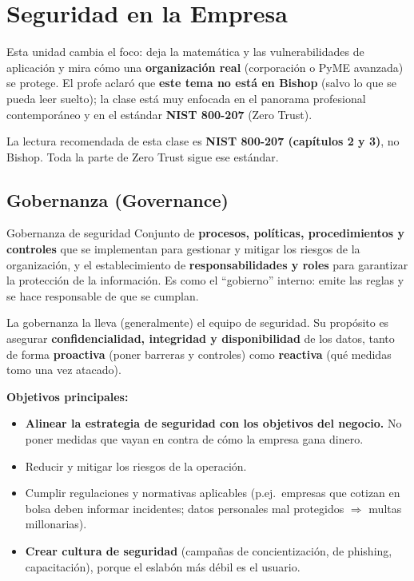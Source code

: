 \documentclass[../main.tex]{subfiles}
\begin{document}
\section{Seguridad en la Empresa}

Esta unidad cambia el foco: deja la matemática y las vulnerabilidades de
aplicación y mira cómo una \textbf{organización real} (corporación o PyME
avanzada) se protege. El profe aclaró que \textbf{este tema no está en Bishop}
(salvo lo que se pueda leer suelto); la clase está muy enfocada en el panorama
profesional contemporáneo y en el estándar \textbf{NIST 800-207} (Zero Trust).


\begin{examen}
La lectura recomendada de esta clase es \textbf{NIST 800-207 (capítulos 2 y 3)},
no Bishop. Toda la parte de Zero Trust sigue ese estándar.
\end{examen}

\subsection{Gobernanza (Governance)}

\begin{definicion}{Gobernanza de seguridad}
Conjunto de \textbf{procesos, políticas, procedimientos y controles} que se
implementan para gestionar y mitigar los riesgos de la organización, y el
establecimiento de \textbf{responsabilidades y roles} para garantizar la
protección de la información. Es como el ``gobierno'' interno: emite las reglas
y se hace responsable de que se cumplan.
\end{definicion}

La gobernanza la lleva (generalmente) el equipo de seguridad. Su propósito es
asegurar \textbf{confidencialidad, integridad y disponibilidad} de los datos,
tanto de forma \textbf{proactiva} (poner barreras y controles) como
\textbf{reactiva} (qué medidas tomo una vez atacado).

\textbf{Objetivos principales:}
\begin{itemize}
  \item \textbf{Alinear la estrategia de seguridad con los objetivos del
    negocio.} No poner medidas que vayan en contra de cómo la empresa gana
    dinero.
  \item Reducir y mitigar los riesgos de la operación.
  \item Cumplir regulaciones y normativas aplicables (p.ej.\ empresas que
    cotizan en bolsa deben informar incidentes; datos personales mal protegidos
    $\Rightarrow$ multas millonarias).
  \item \textbf{Crear cultura de seguridad} (campañas de concientización, de
    phishing, capacitación), porque el eslabón más débil es el usuario.
\end{itemize}
\end{document}
